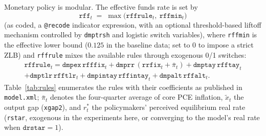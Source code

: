 Monetary policy is modular. The effective funds rate is set by
\begin{equation}
\texttt{rff}_t \;=\; \max\big(\texttt{rffrule}_t,\ \texttt{rffmin}_t\big)
\label{eq:rff}
\end{equation}
(as coded, a \texttt{@recode} indicator expression, with an optional threshold-based liftoff mechanism controlled by \texttt{dmptrsh} and logistic switch variables), where \texttt{rffmin} is the effective lower bound ($0.125$ in the baseline data; set to 0 to impose a strict ZLB) and \texttt{rffrule} mixes the available rules through exogenous 0/1 switches:
\begin{multline}
\texttt{rffrule}_t = \texttt{dmpex}\,\texttt{rfffix}_t + \texttt{dmprr}\,(\texttt{rrfix}_t+\bar\pi_t) + \texttt{dmptay}\,\texttt{rfftay}_t \\
 + \texttt{dmptlr}\,\texttt{rfftlr}_t + \texttt{dmpintay}\,\texttt{rffintay}_t + \texttt{dmpalt}\,\texttt{rffalt}_t .
\label{eq:rffrule}
\end{multline}
Table~\ref{tab:rules} enumerates the rules with their coefficients as published in \texttt{model.xml}; $\bar\pi_t$ denotes the four-quarter average of core PCE inflation, $\tilde x_t$ the output gap (\texttt{xgap2}), and $r^{*}_t$ the policymakers' perceived equilibrium real rate (\texttt{rstar}, exogenous in the experiments here, or converging to the model's real rate when $\texttt{drstar}=1$).

